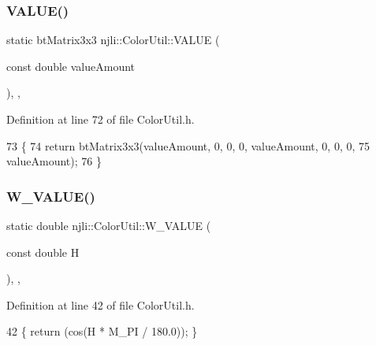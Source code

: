 \subsubsection{\texorpdfstring{V\+A\+L\+U\+E()}{VALUE()}}
{\footnotesize\ttfamily static bt\+Matrix3x3 njli\+::\+Color\+Util\+::\+V\+A\+L\+UE (\begin{DoxyParamCaption}\item[{const double}]{value\+Amount }\end{DoxyParamCaption})\hspace{0.3cm}{\ttfamily [inline]}, {\ttfamily [static]}, {\ttfamily [private]}}



Definition at line 72 of file Color\+Util.\+h.


\begin{DoxyCode}
73     \{
74       \textcolor{keywordflow}{return} btMatrix3x3(valueAmount, 0, 0, 0, valueAmount, 0, 0, 0,
75                          valueAmount);
76     \}
\end{DoxyCode}
\mbox{\label{classnjli_1_1_color_util_a546dcc4ae049c5b45d9bd20870226768}} 
\subsubsection{\texorpdfstring{W\+\_\+\+V\+A\+L\+U\+E()}{W\_VALUE()}}
{\footnotesize\ttfamily static double njli\+::\+Color\+Util\+::\+W\+\_\+\+V\+A\+L\+UE (\begin{DoxyParamCaption}\item[{const double}]{H }\end{DoxyParamCaption})\hspace{0.3cm}{\ttfamily [inline]}, {\ttfamily [static]}, {\ttfamily [private]}}



Definition at line 42 of file Color\+Util.\+h.


\begin{DoxyCode}
42 \{ \textcolor{keywordflow}{return} (cos(H * M\_PI / 180.0)); \}
\end{DoxyCode}
\mbox{\label{classnjli_1_1_color_util_a7db2133606fdf47afcbf7b8511a33dbe}} 
